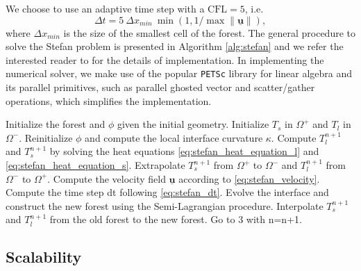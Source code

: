 We choose to use an adaptive time step with a $\text{CFL} = 5$, i.e.
\begin{equation} \label{eq:stefan_dt}
\Delta t = 5 ~ \Delta x_{min} ~ \min(1,1/\max \lVert \underline{\mathbf{u}} \rVert),
\end{equation}
where $\Delta x_{min}$ is the size of the smallest cell of the forest. The general procedure to solve the Stefan problem is presented in Algorithm \ref{alg:stefan} and we refer the interested reader to \cite{Chen;Min;Gibou:09:A-numerical-scheme-f} for the details of implementation. In implementing the numerical solver, we make use of the popular \texttt{PETSc}
\cite{Balay;Abhyankar;Adams;etal:14:PETSc-Web-page} library for linear algebra and its parallel primitives, such as parallel ghosted vector and scatter/gather operations, which simplifies the implementation.


\begin{algorithm}[htbp]
\caption{$\texttt{General procedure for solving the Stefan problem}$}
\begin{algorithmic}[1]
\State Initialize the forest and $\phi$ given the initial geometry.
\State Initialize $T_s$ in $\Omega^+$ and $T_l$ in $\Omega^-$.
\State Reinitialize $\phi$ and compute the local interface curvature $\kappa$.
\State Compute $T^{n+1}_l$ and $T^{n+1}_s$ by solving the heat equations \eqref{eq:stefan_heat_equation_l} and \eqref{eq:stefan_heat_equation_s}.
\State Extrapolate $T^{n+1}_s$ from $\Omega^+$ to $\Omega^-$ and $T^{n+1}_l$ from $\Omega^-$ to $\Omega^+$.
\State Compute the velocity field $\underline{\mathbf{u}}$ according to \eqref{eq:stefan_velocity}.
\State Compute the time step dt following \eqref{eq:stefan_dt}.
\State Evolve the interface and construct the new forest using the Semi-Lagrangian procedure.
\State Interpolate $T^{n+1}_s$ and $T^{n+1}_l$ from the old forest to the new forest.
\State Go to 3 with n=n+1.
\end{algorithmic}
\label{alg:stefan}
\end{algorithm}

\subsection{Scalability}

